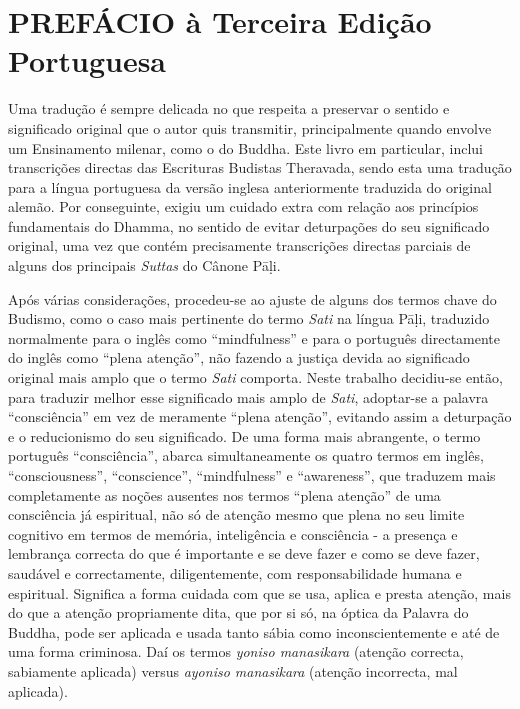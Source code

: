 \chapter{PREFÁCIO à Terceira Edição Portuguesa}

Uma tradução é sempre delicada no que respeita a preservar o sentido e significado original que o autor quis transmitir, principalmente quando envolve um Ensinamento milenar, como o do Buddha. Este livro em particular, inclui transcrições directas das Escrituras Budistas Theravada, sendo esta uma tradução para a língua portuguesa da versão inglesa anteriormente traduzida do original alemão. Por conseguinte, exigiu um cuidado extra com relação aos princípios fundamentais do Dhamma, no sentido de evitar deturpações do seu significado original, uma vez que contém precisamente transcrições directas parciais de alguns dos principais \emph{Suttas} do Cânone Pāḷi.

Após várias considerações, procedeu-se ao ajuste de alguns dos termos chave do Budismo, como o caso mais pertinente do termo \emph{Sati} na língua Pāḷi, traduzido normalmente para o inglês como ``mindfulness'' e para o português directamente do inglês como ``plena atenção'', não fazendo a justiça devida ao significado original mais amplo que o termo \emph{Sati} comporta. Neste trabalho decidiu-se então, para traduzir melhor esse significado mais amplo de \emph{Sati}, adoptar-se a palavra ``consciência'' em vez de meramente ``plena atenção'', evitando assim a deturpação e o reducionismo do seu significado. De uma forma mais abrangente, o termo português ``consciência'', abarca simultaneamente os quatro termos em inglês, ``consciousness'', ``conscience'', ``mindfulness'' e ``awareness'', que traduzem mais completamente as noções ausentes nos termos ``plena atenção'' de uma consciência já espiritual, não só de atenção mesmo que plena no seu limite cognitivo em termos de memória, inteligência e consciência - a presença e lembrança correcta do que é importante e se deve fazer e como se deve fazer, saudável e correctamente, diligentemente, com responsabilidade humana e espiritual. Significa a forma cuidada com que se usa, aplica e presta atenção, mais do que a atenção propriamente dita, que por si só, na óptica da Palavra do Buddha, pode ser aplicada e usada tanto sábia como inconscientemente e até de uma forma criminosa. Daí os termos \emph{yoniso manasikara} (atenção correcta, sabiamente aplicada) versus \emph{ayoniso manasikara} (atenção incorrecta, mal aplicada).


